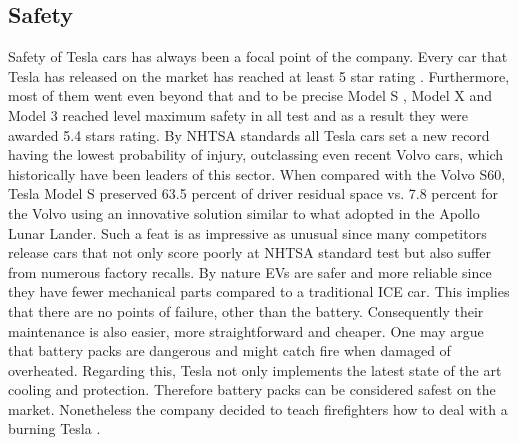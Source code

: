 \subsection{Safety}
Safety of Tesla cars has always been a focal point of the company.
Every car that Tesla has released on the market has reached at least 5 star rating \cite{Safety}.%
Furthermore, most of them went even beyond that and to be precise Model S \cite{ModelS-Rating} , Model X and Model 3 reached level maximum safety in all test and as a result they were awarded 5.4 stars rating.%
By NHTSA standards all Tesla cars set a new record having the lowest probability of injury, outclassing even recent Volvo cars, which historically have been leaders of this sector. When compared with the Volvo S60, Tesla Model S preserved 63.5 percent of driver residual space vs. 7.8 percent for the Volvo using an innovative solution similar to what adopted in the Apollo Lunar Lander.%
Such a feat is as impressive as unusual since many competitors release cars that not only score poorly at NHTSA standard test but also suffer from  numerous factory recalls. 
\newline 
By nature EVs are safer and more reliable since they have fewer mechanical parts compared to a traditional ICE car. This implies that there are no points of failure, other than the battery.%
Consequently their maintenance is also easier, more straightforward and cheaper.%
\newline One may argue that battery packs are dangerous and might catch fire when damaged of overheated. Regarding this, Tesla not only implements the latest state of the art cooling and protection.%
Therefore battery packs can be considered safest on the market.%
Nonetheless the company decided to teach firefighters how to deal with a burning Tesla \cite{Tesla Training Fire}.%
